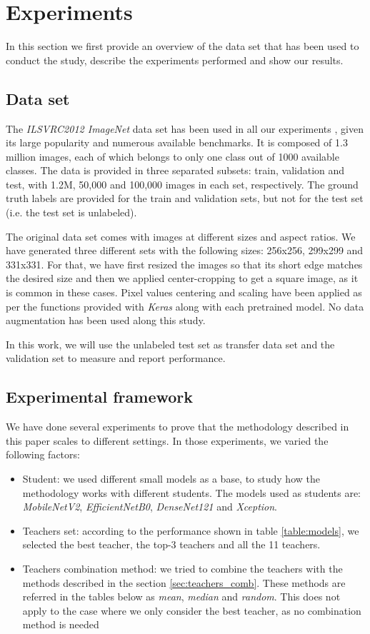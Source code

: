 \documentclass{elsarticle}
\begin{document}
	\section{Experiments} \label{sec:experiments}
	In this section we first provide an overview of the data set that has been used to conduct the study, describe the experiments performed and show our results.
	
	\subsection{Data set}
	The \textit{ILSVRC2012 ImageNet} data set has been used in all our experiments \cite{ILSVRC15}, given its large popularity and numerous available benchmarks. It is composed of 1.3 million images,  each of which belongs to only one class out of 1000 available classes. The data is provided in three separated subsets: train, validation and test, with 1.2M, 50,000 and 100,000 images in each set, respectively. The ground truth labels are provided for the train and validation sets, but not for the test set (i.e. the test set is unlabeled).
	
	The original data set comes with images at different sizes and aspect ratios. We have generated three different sets with the following sizes: 256x256, 299x299 and 331x331. For that, we have first resized the images so that its short edge matches the desired size and then we applied center-cropping to get a square image, as it is common in these cases. Pixel values centering and scaling have been applied as per the functions provided with \textit{Keras} along with each pretrained model. No data augmentation has been used along this study.
	
	In this work, we will use the unlabeled test set as transfer data set and the validation set to measure and report performance. 
	
	\subsection{Experimental framework}
	We have done several experiments to prove that the methodology described in this paper scales to different settings. In those experiments, we varied the following factors:
	
	\begin{itemize}
		\item Student: we used different small models as a base, to study how the methodology works with different students. The models used as students are: \textit{MobileNetV2}, \textit{EfficientNetB0}, \textit{DenseNet121} and \textit{Xception}.
		\item Teachers set: according to the performance shown in table \ref{table:models}, we selected the best teacher, the top-3 teachers and all the 11 teachers.
		\item Teachers combination method: we tried to combine the teachers with the methods described in the section \ref{sec:teachers_comb}. These methods are referred in the tables below as \textit{mean}, \textit{median} and \textit{random}. This does not apply to the case where we only consider the best teacher, as no combination method is needed
	\end{itemize}
\end{document}
